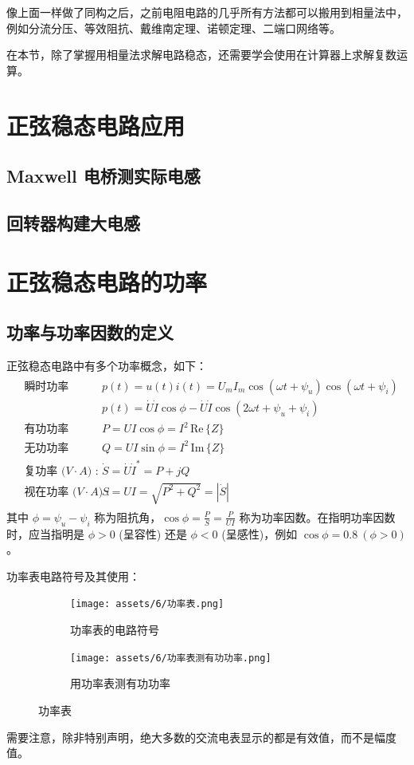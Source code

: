 \documentclass[UTF8]{report}
\def\Im{\,\mathrm{Im}\,}
\def\Re{\,\mathrm{Re}\,}
\theoremstyle{MyLineTheoremStyle} %
\theoremstyle{MyBlockTheoremStyle} %
\theoremstyle{MySubsubsectionStyle} %
\begin{document}
像上面一样做了同构之后，之前电阻电路的几乎所有方法都可以搬用到相量法中，例如分流分压、等效阻抗、戴维南定理、诺顿定理、二端口网络等。

在本节，除了掌握用相量法求解电路稳态，还需要学会使用在计算器上求解复数运算。

\section{正弦稳态电路应用}

\subsection{Maxwell 电桥测实际电感}
\subsection{回转器构建大电感}

\section{正弦稳态电路的功率}
\subsection{功率与功率因数的定义}
正弦稳态电路中有多个功率概念，如下：
\begin{align}
\begin{aligned}
& \text{瞬时功率 (W) :} && p(t) = u(t)i(t) = U_m I_m \cos(\omega t + \psi_u) \cos(\omega t + \psi_i) \\ 
& && p(t) = \dot{U}\dot{I}\cos \phi - \dot{U}\dot{I} \cos (2 \omega t + \psi_u + \psi_i) \\
& \text{有功功率 (W) :} && P = UI \cos \phi = I^2\Re \{Z\}\\
& \text{无功功率 (var) :} && Q = UI \sin \phi = I^2\Im \{Z\}\\
& \text{复功率 ($V\cdot A$) :} && \dot{S} = \dot{U}\dot{I}^* = P + jQ \\
& \text{视在功率 ($V\cdot A$) :} && S = UI = \sqrt{P^2 + Q^2} = |\dot{S} | 
\end{aligned}
\end{align}
其中 $\phi = \psi_u - \psi_i$ 称为阻抗角，$\cos \phi = \frac{P}{S} = \frac{P}{UI}$ 称为功率因数。在指明功率因数时，应当指明是 $\phi > 0$ (呈容性) 还是 $\phi < 0$ (呈感性)，例如 $\cos \phi = 0.8\ (\phi > 0)$。



功率表电路符号及其使用：
\begin{figure}[H]\centering
\begin{subfigure}[b]{0.43\columnwidth}\centering
    \texttt{[image: assets/6/功率表.png]}
    \caption{功率表的电路符号}
\end{subfigure}\hfill
\begin{subfigure}[b]{0.55\columnwidth}\centering
    \texttt{[image: assets/6/功率表测有功功率.png]}
    \caption{用功率表测有功功率}
\end{subfigure}
\caption{功率表}
\end{figure}
需要注意，除非特别声明，绝大多数的交流电表显示的都是有效值，而不是幅度值。
\end{document}
